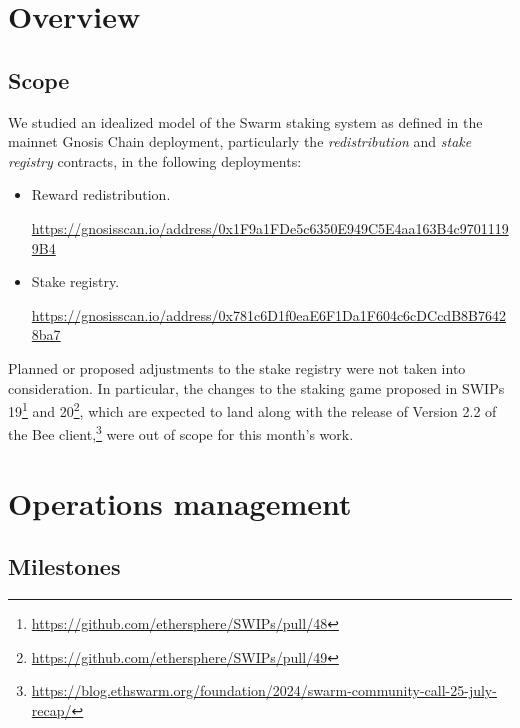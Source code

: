 
\maketitle
\section*{Overview}


\subsection*{Scope}

We studied an idealized model of the Swarm staking system as defined in the mainnet Gnosis Chain deployment, particularly the \emph{redistribution} and \emph{stake registry} contracts, in the following deployments:

\begin{itemize}
\item Reward redistribution. 

{\small\url{https://gnosisscan.io/address/0x1F9a1FDe5c6350E949C5E4aa163B4c97011199B4}}
\item Stake registry. 

{\small\url{https://gnosisscan.io/address/0x781c6D1f0eaE6F1Da1F604c6cDCcdB8B76428ba7}}
\end{itemize}

Planned or proposed adjustments to the stake registry were not taken into consideration. In particular, the changes to the staking game proposed in SWIPs 19\footnote{\url{https://github.com/ethersphere/SWIPs/pull/48}} and 20\footnote{\url{https://github.com/ethersphere/SWIPs/pull/49}}, which are expected to land along with the release of Version 2.2 of the Bee client,\footnote{\url{https://blog.ethswarm.org/foundation/2024/swarm-community-call-25-july-recap/}} were out of scope for this month's work.

\section*{Operations management}

\subsection*{Milestones}

